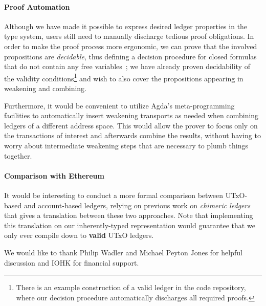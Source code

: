 \documentclass[sigplan,review,screen]{acmart}\settopmatter{printfolios=true,printccs=false,printacmref=false}
\begin{document}
\paragraph{Proof Automation}
Although we have made it possible to express desired ledger properties in the type system,
users still need to manually discharge tedious proof obligations.
In order to make the proof process more ergonomic, we can prove that the involved propositions are \textit{decidable},
thus defining a decision procedure for closed formulas that do not contain any free variables~\cite{proofbyreflection};
we have already proven decidability of the validity conditions\footnote{
There is an example construction of a valid ledger in the code repository,
where our decision procedure automatically discharges all required proofs.
}
and wish to also cover the propositions appearing in weakening and combining.

Furthermore, it would be convenient to utilize Agda's meta-programming facilities to
automatically insert weakening transports as needed when combining ledgers of a different address space.
This would allow the prover to focus only on the transactions of interest and afterwards combine the results,
without having to worry about intermediate weakening steps that are necessary to plumb things together.

\paragraph{Comparison with Ethereum}
It would be interesting to conduct a more formal comparison between UTxO-based and account-based ledgers,
relying on previous work on \textit{chimeric ledgers}~\cite{chimeric} that gives a translation between these two approaches.
Note that implementing this translation on our inherently-typed representation would
guarantee that we only ever compile down to \textbf{valid} UTxO ledgers.

\begin{acks}
We would like to thank Philip Wadler and Michael Peyton Jones for helpful discussion and IOHK for financial support.
\end{acks}


\end{document}
